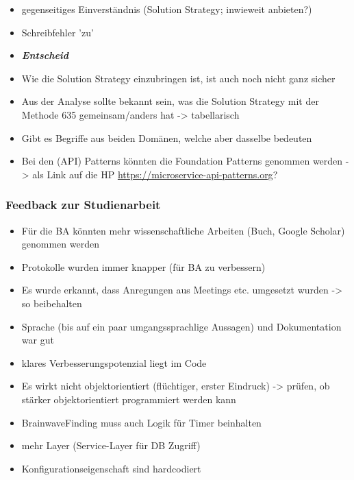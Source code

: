 \begin{itemize}

\item
  gegenseitiges Einverständnis (Solution Strategy; inwieweit anbieten?)
\item
  Schreibfehler 'zu' 
\item \emph{\textbf{Entscheid}}
\item
  Wie die Solution Strategy einzubringen ist, ist auch noch nicht ganz
  sicher
\item
  Aus der Analyse sollte bekannt sein, was die Solution Strategy mit der
  Methode 635 gemeinsam/anders hat -\textgreater{} tabellarisch
\item
  Gibt es Begriffe aus beiden Domänen, welche aber dasselbe bedeuten
\item
  Bei den (API) Patterns könnten die Foundation Patterns genommen werden
  -\textgreater{} als Link auf die HP
  \href{https://microservice-api-patterns.org}{https://microservice-api-patterns.org}?
\end{itemize}

\hypertarget{feedback-zur-studienarbeit}{%
\subsubsection*{Feedback zur
Studienarbeit}\label{feedback-zur-studienarbeit}}

\begin{itemize}
\item
  Für die BA könnten mehr wissenschaftliche Arbeiten (Buch, Google
  Scholar) genommen werden
\item
  Protokolle wurden immer knapper (für BA zu verbessern)
\item
  Es wurde erkannt, dass Anregungen aus Meetings etc. umgesetzt wurden
  -\textgreater{} so beibehalten
\item
  Sprache (bis auf ein paar umgangssprachlige Aussagen) und
  Dokumentation war gut
\item
  klares Verbesserungspotenzial liegt im Code
\item
  Es wirkt nicht objektorientiert (flüchtiger, erster Eindruck)
  -\textgreater{} prüfen, ob stärker objektorientiert programmiert
  werden kann
\item
  BrainwaveFinding muss auch Logik für Timer beinhalten
\item
  mehr Layer (Service-Layer für DB Zugriff)
\item
  Konfigurationseigenschaft sind hardcodiert
\end{itemize}

